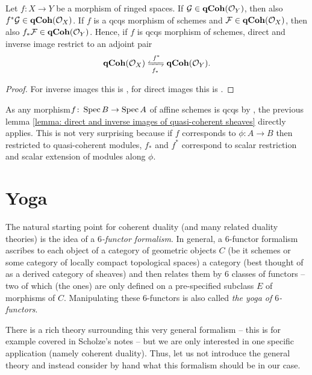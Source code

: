 \begin{lemma}
	\label{lemma: direct and inverse images of quasi-coherent sheaves}
	
	Let $f\colon X\to Y$ be a morphism of ringed spaces. If ${\mathcal{G}} \in {{\mathbf{qCoh}}({{\mathcal{O}}_{Y}})}$, then also $f^\ast {\mathcal{G}} \in {{\mathbf{qCoh}}({{\mathcal{O}}_{X}})}$. If $f$ is a qcqs morphism of schemes and ${\mathcal{F}}\in{{\mathbf{qCoh}}({{\mathcal{O}}_{X}})}$, then also $f_\ast{\mathcal{F}} \in {{\mathbf{qCoh}}({{\mathcal{O}}_{Y}})}$. Hence, if $f$ is qcqs morphism of schemes, direct and inverse image restrict to an adjoint pair
	$$\qCoh X \xleftrightarrows{f^\ast}{f_\ast} \qCoh Y.$$
\end{lemma}
\begin{proof}
	For inverse images this is \cite[\href{https://stacks.math.columbia.edu/tag/01BG}{Tag 01BG}]{stacks-project}, for direct images this is \cite[\href{https://stacks.math.columbia.edu/tag/01LC}{Tag 01LC}]{stacks-project}.
\end{proof}

\begin{remark}
	As any morphism$ f\colon \operatorname{Spec} B \to \operatorname{Spec} A$ of affine schemes is qcqs by \cite[\href{https://stacks.math.columbia.edu/tag/01S7}{Tag 01S7}]{stacks-project}, the previous lemma \ref{lemma: direct and inverse images of quasi-coherent sheaves} directly applies. This is not very surprising 
	because if $f$ corresponds to $\phi \colon A\to B$ then restricted to quasi-coherent modules, $f_\ast$ and $f^\ast$ correspond to scalar restriction and scalar extension of modules along $\phi$.
\end{remark}

\section{Yoga}
\label{section: yoga}

The natural starting point for coherent duality (and many related duality theories) is the idea of a \emph{$6$-functor formalism}. In general, a $6$-functor formalism ascribes to each object of a category of geometric objects $C$ (be it schemes or some category of locally compact topological spaces) a category (best thought of as a derived category of sheaves) and then relates them by $6$ classes of functors -- two of which (the  ones) are only defined on a pre-specified subclass $E$ of morphisms of $C$. Manipulating these $6$-functors is also called \emph{the yoga of $6$-functors}.

There is a rich theory surrounding this very general formalism -- this is for example covered in Scholze's notes \cite{sixfunctors} -- but we are only interested in one specific application (namely coherent duality). Thus, let us not introduce the general theory and instead consider by hand what this formalism should be in our case.

